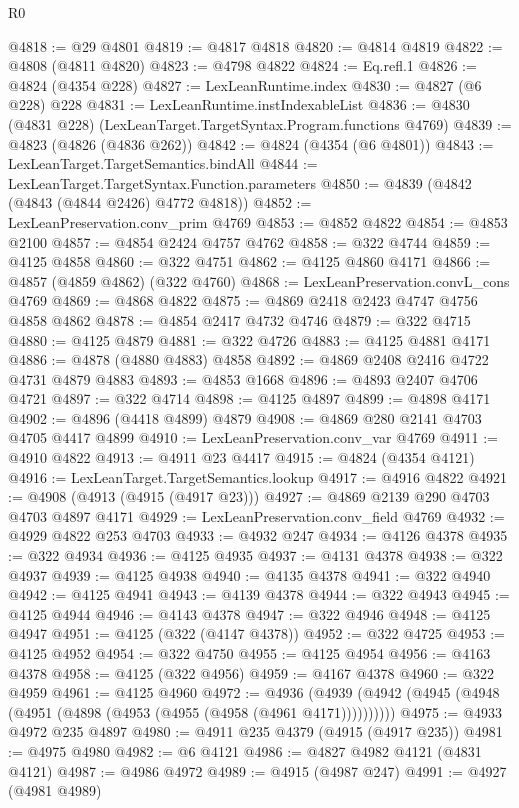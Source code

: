 \begin{lexlean}{R0}
\begin{coremodule}
@4818 := @29 @4801
@4819 := @4817 @4818
@4820 := @4814 @4819
@4822 := @4808 (@4811 @4820)
@4823 := @4798 @4822
@4824 := Eq.refl.{1}
@4826 := @4824 (@4354 @228)
@4827 := LexLeanRuntime.index
@4830 := @4827 (@6 @228) @228
@4831 := LexLeanRuntime.instIndexableList
@4836 := @4830 (@4831 @228) (LexLeanTarget.TargetSyntax.Program.functions @4769)
@4839 := @4823 (@4826 (@4836 @262))
@4842 := @4824 (@4354 (@6 @4801))
@4843 := LexLeanTarget.TargetSemantics.bindAll
@4844 := LexLeanTarget.TargetSyntax.Function.parameters
@4850 := @4839 (@4842 (@4843 (@4844 @2426) @4772 @4818))
@4852 := LexLeanPreservation.conv_prim @4769
@4853 := @4852 @4822
@4854 := @4853 @2100
@4857 := @4854 @2424 @4757 @4762
@4858 := @322 @4744
@4859 := @4125 @4858
@4860 := @322 @4751
@4862 := @4125 @4860 @4171
@4866 := @4857 (@4859 @4862) (@322 @4760)
@4868 := LexLeanPreservation.convL_cons @4769
@4869 := @4868 @4822
@4875 := @4869 @2418 @2423 @4747 @4756 @4858 @4862
@4878 := @4854 @2417 @4732 @4746
@4879 := @322 @4715
@4880 := @4125 @4879
@4881 := @322 @4726
@4883 := @4125 @4881 @4171
@4886 := @4878 (@4880 @4883) @4858
@4892 := @4869 @2408 @2416 @4722 @4731 @4879 @4883
@4893 := @4853 @1668
@4896 := @4893 @2407 @4706 @4721
@4897 := @322 @4714
@4898 := @4125 @4897
@4899 := @4898 @4171
@4902 := @4896 (@4418 @4899) @4879
@4908 := @4869 @280 @2141 @4703 @4705 @4417 @4899
@4910 := LexLeanPreservation.conv_var @4769
@4911 := @4910 @4822
@4913 := @4911 @23 @4417
@4915 := @4824 (@4354 @4121)
@4916 := LexLeanTarget.TargetSemantics.lookup
@4917 := @4916 @4822
@4921 := @4908 (@4913 (@4915 (@4917 @23)))
@4927 := @4869 @2139 @290 @4703 @4703 @4897 @4171
@4929 := LexLeanPreservation.conv_field @4769
@4932 := @4929 @4822 @253 @4703
@4933 := @4932 @247
@4934 := @4126 @4378
@4935 := @322 @4934
@4936 := @4125 @4935
@4937 := @4131 @4378
@4938 := @322 @4937
@4939 := @4125 @4938
@4940 := @4135 @4378
@4941 := @322 @4940
@4942 := @4125 @4941
@4943 := @4139 @4378
@4944 := @322 @4943
@4945 := @4125 @4944
@4946 := @4143 @4378
@4947 := @322 @4946
@4948 := @4125 @4947
@4951 := @4125 (@322 (@4147 @4378))
@4952 := @322 @4725
@4953 := @4125 @4952
@4954 := @322 @4750
@4955 := @4125 @4954
@4956 := @4163 @4378
@4958 := @4125 (@322 @4956)
@4959 := @4167 @4378
@4960 := @322 @4959
@4961 := @4125 @4960
@4972 := @4936 (@4939 (@4942 (@4945 (@4948 (@4951 (@4898 (@4953 (@4955 (@4958 (@4961 @4171))))))))))
@4975 := @4933 @4972 @235 @4897
@4980 := @4911 @235 @4379 (@4915 (@4917 @235))
@4981 := @4975 @4980
@4982 := @6 @4121
@4986 := @4827 @4982 @4121 (@4831 @4121)
@4987 := @4986 @4972
@4989 := @4915 (@4987 @247)
@4991 := @4927 (@4981 @4989)

\end{coremodule}
\end{lexlean}
